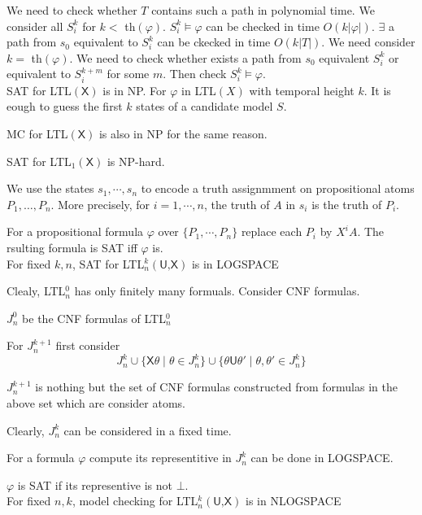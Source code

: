 \documentclass[12pt]{article}
\begin{document}
\begin{CJK*}{GBK}{song}
We need to check whether $T$ contains such a path in polynomial time. We consider all $S^k_i$ for $k<$ th$(\varphi)$. $S^k_i\models \varphi$ can be checked in time $O(k|\varphi|)$. $\exists $ a path from $s_0$ equivalent to $S^k_i$ can be ckecked in time $O(k|T|)$. We need consider $k=$ th$(\varphi)$. We need to check whether exists a path from $s_0$ equivalent $S^k_i$ or equivalent to $S^{k+m}_i$ for some $m$. Then check $S^k_i\models\varphi$.\\



SAT for LTL$(\textsf{X})$ is in NP. For $\varphi$ in LTL$(X)$ with temporal height $k$.  It is eough to guess the first $k$ states of a candidate model $S$. 

MC for LTL$(\textsf{X})$ is also in NP for the same reason.


SAT for LTL$_1(\textsf{X})$ is NP-hard. 

We use the states $s_1,\cdots, s_n$ to encode a truth assignmment on propositional atoms $P_1,\dots, P_n$. More precisely, for $i=1,\cdots, n$, the truth of $A$ in $s_i$ is the truth of $P_i$. 

For a propositional formula $\varphi$ over $\{P_1,\cdots, P_n\}$ replace each $P_i$ by $X^iA$. The rsulting formula is SAT iff $\varphi$ is.\\




For fixed $k,n$, SAT for LTL$_n^k(\textsf{U,X})$ is in LOGSPACE

Clealy, LTL$^0_n$ has only finitely many formuals. Consider CNF formulas.

$J_n^0$ be the CNF formulas of LTL$^0_n$

For $J_n^{k+1}$ first consider
%
$$J_n^k\cup\{\textsf{X}\theta\mid \theta\in J_n^k\}\cup\{\theta\textsf{U}\theta'\mid \theta,\theta'\in J^k_n\}$$

$J_n^{k+1}$ is nothing but the set of CNF formulas constructed from formulas in the above set which are consider atoms.


Clearly, $J_n^k$ can be considered in a fixed time.

For a formula $\varphi$ compute its representitive in $J^k_n$ can be done in LOGSPACE.


$\varphi$ is SAT if its representive is not $\bot$.
\\


For fixed $n,k$, model checking for LTL$_n^k(\textsf{U,X})$ is in NLOGSPACE



\end{CJK*}
\end{document}
